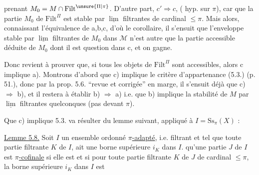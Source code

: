 
prenant $M_0=M\cap\mathrm{Filt}^{\unsure{\Pi|\pi}}$. D'autre part, $c'\Rightarrow c$, ( hyp. sur $\pi$), car   que la partie $M_0$ de $\mathrm{Filt}^{\Pi}$ est stable par $\underline{\lim}$ filtrantes de cardinal $\leq\pi$. Mais alors, connaissant l'équivalence de a,b,c, d'où  le corollaire, il  s'ensuit que l'enveloppe stable par $\underline{\lim}$ filtrantes de $M_0$ dans $\mathcal M$  n'est autre que la partie accessible  déduite de $M_0$ dont il est question dans c, et on gagne.

Donc  revient à prouver que, si tous les objets de $\mathrm{Filt}^{\Pi}$ sont accessibles, alors c implique a). Montrons d'abord que c) implique le critère d'appartenance  (5.3.) (p. 51.), donc par la  prop. 5.6. ``revue et corrigée'' en marge, il s'ensuit déjà que c) $\Rightarrow$ b), et il restera à établir b) $\Rightarrow$ a) i.e. que b) implique la stabilité de $M$ par $\underline{\lim}$ filtrantes quelconques (pas   devant $\pi$).

Que c) implique 5.3. va résulter du lemme suivant, appliqué à $I=\mathrm{Ss}_\pi(X)$ :

\uline{Lemme 5.8.} Soit $I$ un ensemble ordonné \uline{$\pi$-adapté}, i.e. filtrant et tel que toute partie filtrante $K$ de $I$,  ait une borne supérieure $i_K$ dans $I$.    qu'une partie  $J$ de $I$ est  \uline{$\pi$-cofinale} si elle est   et si pour toute partie filtrante $K$ de $J$ de cardinal $\leq\pi$, la borne supérieure $i_K$ dans $I$ est

